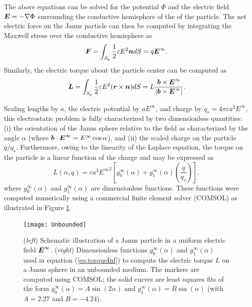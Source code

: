 \begin{appendices}
The above equations can be solved for the potential $\Phi$ and the electric field $\boldsymbol{E}=-\nabla\Phi$ surrounding the conductive hemisphere of the of the particle.
The net electric force on the Janus particle can then be computed by integrating the Maxwell stress over the conductive hemisphere as
\begin{equation}
    \boldsymbol{F} =  \int_{S_p} \frac{1}{2}\varepsilon E^2 \boldsymbol{n} dS = q \boldsymbol{E}^{\infty}.
\end{equation}
Similarly, the electric torque about the particle center can be computed as
\begin{equation}
    \boldsymbol{L} =  \int_{S_p} \frac{1}{2}\varepsilon E^2 (\boldsymbol{r}\times \boldsymbol{n}) dS = L \frac{\boldsymbol{b}\times\boldsymbol{E}^{\infty}}{|\boldsymbol{b}\times\boldsymbol{E}^{\infty}|}.
\end{equation}

Scaling lengths by $a$, the electric potential by $a E^{\infty}$, and charge by $q_s=4\pi\varepsilon a^2 E^{\infty}$, this electrostatic problem is fully characterized by two dimensionless quantities: (i) the orientation of the Janus sphere relative to the field as characterized by the angle $\alpha$ (where $\boldsymbol{b}\cdot\boldsymbol{E}^{\infty} = E^{\infty} \cos\alpha$), and (ii) the scaled charge on the particle $q / q_s$.
Furthermore, owing to the linearity of the Laplace equation, the torque on the particle is a linear function of the charge and may be expressed as
\begin{equation}
    L(\alpha,q) = \varepsilon a^3 {E^{\infty}}^2 \left[g_0^{\infty}(\alpha) + g_1^{\infty}(\alpha) \left(\frac{q}{q_s}\right) \right], \label{eq:torqueInf}
\end{equation}
where $g_0^{\infty}(\alpha)$ and $g_1^{\infty}(\alpha)$ are dimensionless functions. These functions were computed numerically using a commercial finite element solver (COMSOL) as illustrated in Figure \ref{fig:TorqueFunctions}.

\begin{figure}[h]
    \centering
    \texttt{[image: Unbounded]}
    \caption{(\emph{left}) Schematic illustration of a Janus particle in a uniform electric field $\boldsymbol{E}^{\infty}$.  (\emph{right}) Dimensionless functions $g_0^{\infty}(\alpha)$ and $g_1^{\infty}(\alpha)$ used in equation (\ref{eq:torqueInf}) to compute the electric torque $L$ on a Janus sphere in an unbounded medium. The markers are computed using COMSOL; the solid curves are least squares fits of the form $g_0^{\infty}(\alpha)=A\sin(2\alpha)$ and $g_1^{\infty}(\alpha)=B \sin(\alpha)$ (with $A=2.27$ and $B=-4.24$).}
    \label{fig:TorqueFunctions}
\end{figure}



\end{appendices}

